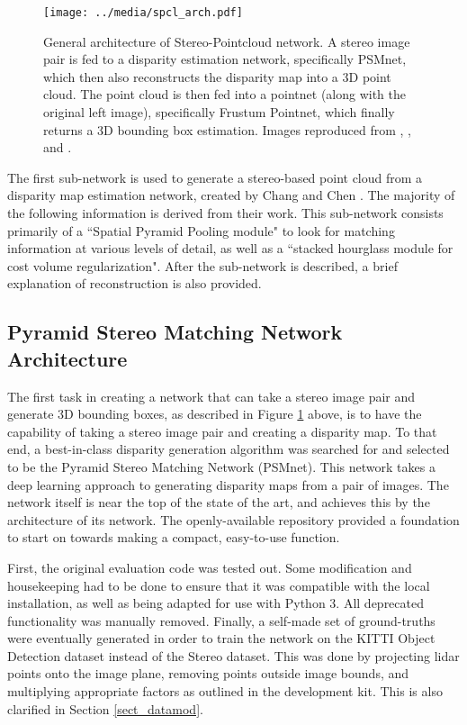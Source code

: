 \begin{figure}[ht]
	\centering
	\texttt{[image: ../media/spcl\_arch.pdf]}
	\caption{General architecture of Stereo-Pointcloud network. A stereo image pair is fed to a disparity estimation network, specifically PSMnet, which then also reconstructs the disparity map into a 3D point cloud. The point cloud is then fed into a pointnet (along with the original left image), specifically Frustum Pointnet, which finally returns a 3D bounding box estimation. Images reproduced from \cite{geiger_are_2012}, \cite{chang_pyramid_2018}, and \cite{qi_frustum_2017}.}
	\label{spcl_arch}
\end{figure}

The first sub-network is used to generate a stereo-based point cloud from a disparity map estimation network, created by Chang and Chen \cite{chang_pyramid_2018}. The majority of the following information is derived from their work. This sub-network consists primarily of a ``Spatial Pyramid Pooling module" to look for matching information at various levels of detail, as well as a ``stacked hourglass module for cost volume regularization". After the sub-network is described, a brief explanation of reconstruction is also provided. 

\subsection{Pyramid Stereo Matching Network Architecture}
The first task in creating a network that can take a stereo image pair and generate 3D bounding boxes, as described in Figure \ref{spcl_arch} above, is to have the capability of taking a stereo image pair and creating a disparity map. To that end, a best-in-class disparity generation algorithm was searched for and selected to be the Pyramid Stereo Matching Network (PSMnet). This network takes a deep learning approach to generating disparity maps from a pair of images. The network itself is near the top of the state of the art, and achieves this by the architecture of its network. The openly-available repository provided a foundation to start on towards making a compact, easy-to-use function.

First, the original evaluation code was tested out. Some modification and housekeeping had to be done to ensure that it was compatible with the local installation, as well as being adapted for use with Python 3. All deprecated functionality was manually removed. Finally, a self-made set of ground-truths were eventually generated in order to train the network on the KITTI Object Detection dataset instead of the Stereo dataset. This was done by projecting lidar points onto the image plane, removing points outside image bounds, and multiplying appropriate factors as outlined in the development kit. This is also clarified in Section \ref{sect_datamod}.

